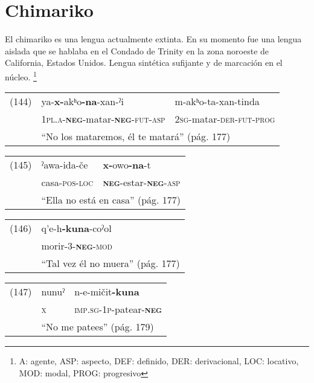 \section*{Chimariko}

\noindent El chimariko es una lengua actualmente extinta. En su momento fue una lengua aislada que se hablaba en el Condado de Trinity en la zona noroeste de California, Estados Unidos. Lengua sintética sufijante y de marcación en el núcleo.
\footnote{A: agente, ASP: aspecto, DEF: definido, DER: derivacional, LOC: locativo, MOD: modal, PROG: progresivo}
\vspace{0.5cm}

{\setmainfont{Charis SIL} 

\begin{tabular}{lll}    
(144) & ya-\textbf{x-}akʰo\textbf{-na}-xan-ˀi & m-akʰo-ta-xan-tinda \\
& \textsc{1pl.a-\textbf{neg}-}matar-\textsc{\textbf{neg}-fut-asp} & \textsc{2sg-}matar-\textsc{der-fut-prog} \\
& \multicolumn{2}{l}{``No los mataremos, él te matará'' (pág. 177)}
\end{tabular} \vspace{0.5cm}

\begin{tabular}{lll}
(145) & ˀawa-ida-če & \textbf{x-}owo\textbf{-na}-t \\
& casa-\textsc{pos-loc} & \textsc{\textbf{neg}-}estar-\textsc{\textbf{neg}-asp} \\
& \multicolumn{2}{l}{``Ella no está en casa'' (pág. 177)}
\end{tabular} \vspace{0.5cm}

\begin{tabular}{ll}
(146) & q’e-h\textbf{-kuna}-coˀol \\
& morir-\textsc{3-\textbf{neg}-mod} \\
& ``Tal vez él no muera'' (pág. 177)
\end{tabular} \vspace{0.5cm}

\begin{tabular}{lll}
(147) & nunuˀ & n-e-mičit\textbf{-kuna} \\
& \textsc{x} & \textsc{imp.sg-1p-}patear-\textsc{\textbf{neg}} \\
& \multicolumn{2}{l}{``No me patees'' (pág. 179)}
\end{tabular} \vspace{0.5cm}

}
